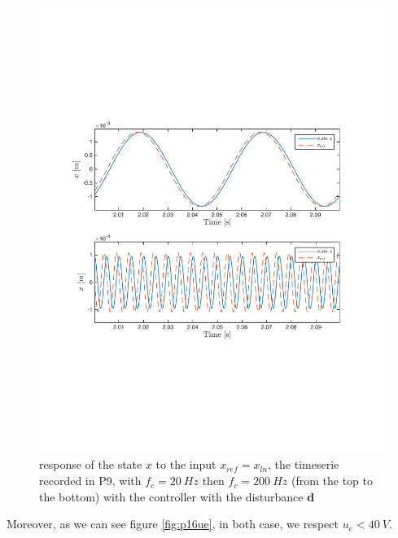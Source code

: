 \begin{figure}[H]
 \centering 
 \includegraphics[trim=2cm 7cm 2cm 7cm, clip=true, totalheight=0.35\textheight, angle=0]{figures/p16d.pdf}
 \caption{response of the state $x$ to the input $x_{ref} = x_{ln}$, the timeserie recorded in P9, with $f_c = 20\ Hz$ then $f_c=200\ Hz$ (from the top to the bottom) with the controller with the disturbance \textbf{d}}
 \label{fig:p16d}
\end{figure}

Moreover, as we can see figure \ref{fig:p16ue}, in both case, we respect $u_e < 40\ V$.

